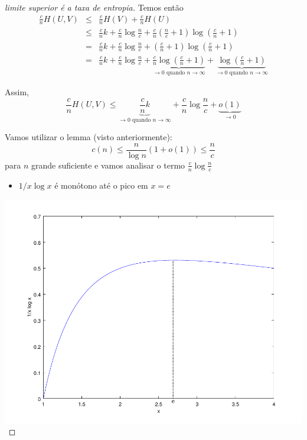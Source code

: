 \begin{frame}[allowframebreaks]
\begin{proof}[limite superior é a taxa de entropia]
  \proofbreak

  Temos então
  \begin{eqnarray}
  \frac{c}{n} H(U,V) &\leq& \frac{c}{n} H(V) + \frac{c}{n} H(U) \nonumber \\
	&\leq& \frac{c}{n} k + \frac{c}{n} \log \frac{n}{c} + \frac{c}{n} \left( \frac{n}{c} + 1 \right) \log \left( \frac{c}{n} + 1 \right) \nonumber \\
	&=& \frac{c}{n} k + \frac{c}{n} \log \frac{n}{c} + \left( \frac{c}{n} + 1 \right) \log \left( \frac{c}{n} + 1 \right) \nonumber \\
	&=& \frac{c}{n} k + \frac{c}{n} \log \frac{n}{c} + 
		\underbrace{ \frac{c}{n} \log \left( \frac{c}{n} + 1 \right) }_{\rightarrow 0 \text{ quando } n \rightarrow \infty} 
		+ \underbrace{ \log \left( \frac{c}{n} + 1 \right) }_{\rightarrow 0 \text{ quando } n \rightarrow \infty} 
  \end{eqnarray}
 
  \proofbreak
   Assim,
  \begin{equation}
  \frac{c}{n} H(U,V) \leq \underbrace{ \frac{c}{n} k }_{\rightarrow 0 \text{ quando } n \rightarrow \infty} + 
		\frac{c}{n} \log \frac{n}{c} + \underbrace{ o(1) }_{\rightarrow 0}
  \end{equation}
  
  Vamos utilizar o lemma (visto anteriormente):
  \begin{equation}
  c(n) \leq \frac{n}{\log n} (1 + o(1)) \leq \frac{n}{c} 
  \end{equation}
  para $n$ grande suficiente e vamos analisar o termo $\frac{c}{n} \log \frac{n}{c}$
  
  \proofbreak
  \begin{itemize}
  \item $1/x \log x$ é monótono até o pico em $x=e$  
  \end{itemize}
  \includegraphics[width=0.6\linewidth]{images/1xlogx.pdf}


\end{proof}
\end{frame}
